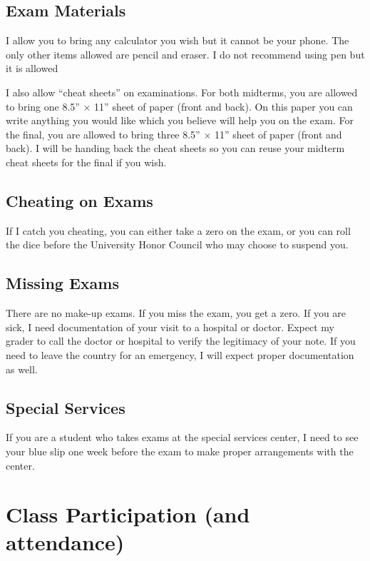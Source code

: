 \documentclass[12pt]{article}
\newcommand{\qu}[1]{``#1''}
\begin{document}
\subsection*{Exam Materials}

I allow you to bring any calculator you wish but it cannot be your phone. The only other items allowed are pencil and eraser. I do not recommend using pen but it is allowed

I also allow \qu{cheat sheets} on examinations. For both midterms, you are allowed to bring one 8.5'' $\times$ 11'' sheet of paper (front and back). On this paper you can write anything you would like which you believe will help you on the exam. For the final, you are allowed to bring three 8.5'' $\times$ 11'' sheet of paper (front and back). I will be handing back the cheat sheets so you can reuse your midterm cheat sheets for the final if you wish. 


\subsection*{Cheating on Exams}

If I catch you cheating, you can either take a zero on the exam, or you can roll the dice before the University Honor Council who may choose to suspend you.


\subsection*{Missing Exams}

There are no make-up exams. If you miss the exam, you get a zero. If you are sick, I need documentation of your visit to a hospital or doctor. Expect my grader to call the doctor or hospital to verify the legitimacy of your note. If you need to leave the country for an emergency, I will expect proper documentation as well.

\subsection*{Special Services}

If you are a student who takes exams at the special services center, I need to see your blue slip one week before the exam to make proper arrangements with the center.

\section*{Class Participation (and attendance)}
\end{document}
